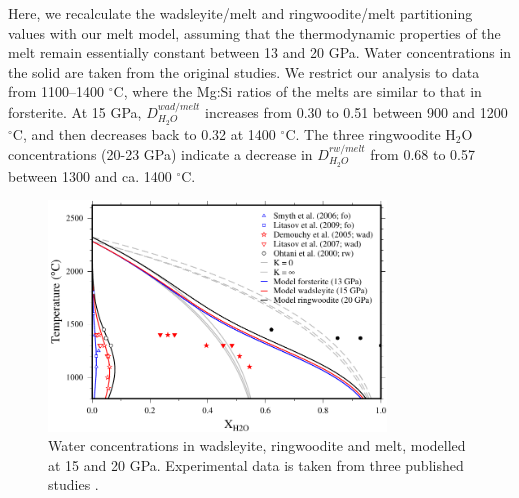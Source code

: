 \documentclass[review]{elsarticle}
\begin{document}
Here, we recalculate the wadsleyite/melt and ringwoodite/melt partitioning values with our melt model, assuming that the thermodynamic properties of the melt remain essentially constant between 13 and 20 GPa. Water concentrations in the solid are taken from the original studies. We restrict our analysis to data from 1100--1400 $^{\circ}$C, where the Mg:Si ratios of the melts are similar to that in forsterite. At 15 GPa, $D^{wad/melt}_{H_2O}$ increases from 0.30 to 0.51 between 900 and 1200 $^{\circ}$C, and then decreases back to 0.32 at 1400 $^{\circ}$C. The three ringwoodite H$_2$O concentrations (20-23 GPa) indicate a decrease in $D^{rw/melt}_{H_2O}$ from 0.68 to 0.57 between 1300 and ca. 1400 $^{\circ}$C.

\begin{figure}[ht!]
  \centering
      \includegraphics[width=0.8\textwidth]{figures/fo_wad_rw}
  \caption{Water concentrations in wadsleyite, ringwoodite and melt, modelled at 15 and 20 GPa. Experimental data is taken from three published studies \citep{OMY2000,DDFK2005,LSOK2011}.}
  \label{fig:fo_wad_rw_melt}
\end{figure}
\end{document}
